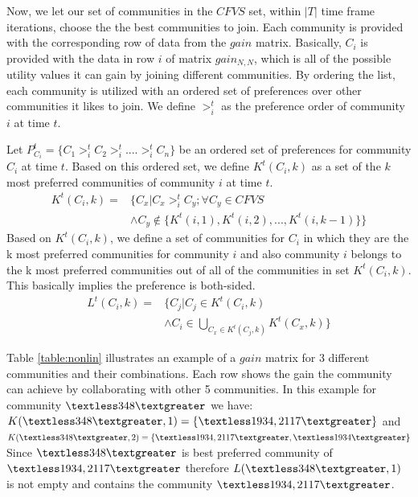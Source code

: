 Now, we let our set of communities in the $CFVS$ set, within $|T|$ time frame iterations, choose the the best communities to join. Each community is provided with the corresponding row of data from the $gain$ matrix. Basically, $C_i$ is provided with the data in row $i$ of matrix $gain_{N,N}$, which is all of the possible utility values it can gain by joining different communities. By ordering the list, each community is utilized with an ordered set of preferences over other communities it likes to join. We define $>_{i}^t$ as the preference order of community $i$ at time $t$.

Let $P_{C_i}^t = \{C_1 >_{i}^t C_2 >_{i}^t .... >_{i}^t C_n\}$ be an ordered set of preferences for community $C_i$ at time $t$. Based on this ordered set, we define $K^t(C_i, k)$ as a set of the $k$ most preferred communities of community $i$ at time $t$.
\begin{equation}\label{h_t_pref_top}
\begin{split}				
K^t(C_i, k) = &\Big\{C_x | C_x >_{i}^t C_y; \forall C_y \in CFVS\ \\
				      &\wedge C_y \notin \{K^t(i, 1),K^t(i, 2),...,K^t(i, k-1)\} \Big\}				
\end{split}
\end{equation}
Based on $K^t(C_i, k)$, we define a set of communities for $C_i$ in which they are the k most preferred communities for community $i$ and also community $i$ belongs to the k most preferred communities out of all of the communities in set $K^t(C_i, k)$. This basically implies the preference is both-sided.
\begin{equation}\label{l_t_top_both}
\begin{split}	
L^t(C_i,k) = &\Big\{C_j | C_j \in K^t(C_i, k) \\
             &\wedge C_i \in \bigcup_{C_x \in K^t(C_j, k)}K^t(C_x, k)\Big\}
\end{split}
\end{equation}

Table \ref{table:nonlin} illustrates an example of a $gain$ matrix for 3 different communities and their combinations. Each row shows the gain the community can achieve by collaborating with other 5 communities. In this example for community $\textless 348 \textgreater$ we have: \\
$K(\textless 348 \textgreater, 1) = \{\textless1934, 2117\textgreater\}$ and \\
$K(\textless 348 \textgreater, 2) = \{\textless1934, 2117\textgreater, \textless1934\textgreater\}$ \\
Since $\textless 348 \textgreater$ is best preferred community of $\textless 1934, 2117 \textgreater$ therefore $L(\textless 348 \textgreater, 1)$ is not empty and contains the community $\textless1934, 2117\textgreater$.

